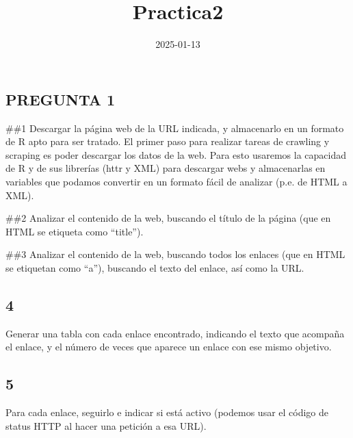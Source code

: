 \documentclass[
]{article}
\title{Practica2}
\author{}
\date{\vspace{-2.5em}2025-01-13}
\begin{document}
\maketitle

\subsection{PREGUNTA 1}\label{pregunta-1}

\#\#1 Descargar la página web de la URL indicada, y almacenarlo en un
formato de R apto para ser tratado. El primer paso para realizar tareas
de crawling y scraping es poder descargar los datos de la web. Para esto
usaremos la capacidad de R y de sus librerías (httr y XML) para
descargar webs y almacenarlas en variables que podamos convertir en un
formato fácil de analizar (p.e. de HTML a XML).

\#\#2 Analizar el contenido de la web, buscando el título de la página
(que en HTML se etiqueta como ``title'').

\#\#3 Analizar el contenido de la web, buscando todos los enlaces (que
en HTML se etiquetan como ``a''), buscando el texto del enlace, así como
la URL.

\subsection{4}\label{section}

Generar una tabla con cada enlace encontrado, indicando el texto que
acompaña el enlace, y el número de veces que aparece un enlace con ese
mismo objetivo.

\subsection{5}\label{section-1}

Para cada enlace, seguirlo e indicar si está activo (podemos usar el
código de status HTTP al hacer una petición a esa URL).
\end{document}

